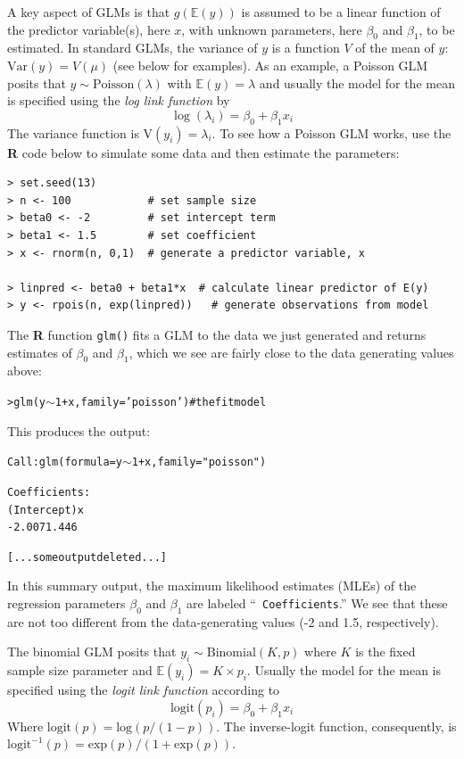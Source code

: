 A key aspect of GLMs is that 
$g(\mathbb{E}(y))$ is assumed to be a linear function of the
predictor variable(s), here $x$, with unknown parameters, here $\beta_0$ and $\beta_1$, to be
estimated. In standard GLMs,
the variance of $y$ is a function $V$ of the mean of $y$: $\mbox{Var}(y) =
V(\mu)$ (see below for examples).
As an example, a Poisson GLM posits that $y \sim \mbox{Poisson}(\lambda)$ with $\mathbb{E}(y)
=\lambda$ and usually the model for the mean is specified using the
{\it log link function} by
\[
\log(\lambda_{i}) = \beta_0 + \beta_{1}  x_{i}
\]
The variance function is $\mbox{V}(y_{i}) = \lambda_{i}$.  
To see how a Poisson GLM works, use the {\bf R} code below to simulate
some data and then estimate the parameters:
{\small
\begin{verbatim}
> set.seed(13)
> n <- 100            # set sample size
> beta0 <- -2         # set intercept term
> beta1 <- 1.5        # set coefficient
> x <- rnorm(n, 0,1)  # generate a predictor variable, x

> linpred <- beta0 + beta1*x  # calculate linear predictor of E(y)
> y <- rpois(n, exp(linpred))   # generate observations from model
\end{verbatim} }
The {\bf R} function {\tt glm()} fits a GLM to the data we just
generated and returns estimates of $\beta_0$ and $\beta_1$, which we
see are fairly close to the data generating values above:
\begin{alltt}
> glm(y \(\sim\) 1 + x, family='poisson')      # the fit model
\end{alltt}
This produces the output:
\begin{alltt}
Call:  glm(formula = y \(\sim\) 1 + x, family = "poisson")

Coefficients:
(Intercept)            x  
     -2.007        1.446  

[... some output deleted ...]
\end{alltt}
In this summary output, the maximum likelihood estimates (MLEs) of the
regression parameters  $\beta_0$ and $\beta_1$ are labeled ``\mbox{\tt
  Coefficients}.'' We see that these are not too different from the
data-generating values (-2 and 1.5, respectively). 


The
binomial GLM posits that $y_{i} \sim \mbox{Binomial}(K,p)$ where $K$
is the fixed sample size parameter and $\mathbb{E}(y_{i}) = K \times p_{i}$. Usually
the model for the mean is specified using the {\it logit link
  function} according to
\[
 \text {logit}(p_{i}) = \beta_{0} + \beta_{1}  x_{i}
\]
Where $\text {logit}(p) = \text {log}(p/(1-p))$.  The inverse-logit function,
consequently, is $\text {logit}^{-1}(p) =
\text {exp}(p)/(1+\text {exp}(p))$.


